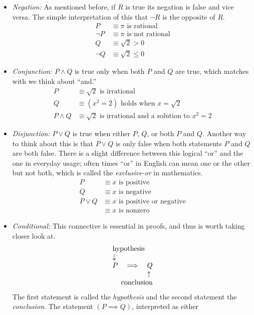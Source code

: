 \documentclass{report}
\begin{document}
\begin{itemize}
	\item \emph{Negation:} As mentioned before, if $R$ is true its negation is false and vice versa. The simple interpretation of this that $\neg R$ is the opposite of $R$.
	\begin{align*}
		P &\equiv \text{$\pi$ is rational} \\
		\neg P &\equiv \text{$\pi$ is not rational} \\
		Q &\equiv \sqrt{2} > 0 \\
		\neg Q &\equiv \sqrt{2} \le 0
	\end{align*}
	
	\item \emph{Conjunction:} $P \wedge Q$ is true only when both $P$ and $Q$ are true, which matches with we think about ``and.''
	\begin{align*}
		P &\equiv \text{$\sqrt{2}$ is irrational} \\
		Q &\equiv \text{$(x^2 = 2)$ holds when $x = \sqrt{2}$} \\
		P \wedge Q &\equiv \text{$\sqrt{2}$ is irrational and a solution to $x^2 = 2$}
	\end{align*}

	\item \emph{Disjunction:} $P \lor Q$ is true when either $P$, $Q$, or both $P$ and $Q$. Another way to think about this is that  $P \lor Q$ is only false when both statements $P$ and $Q$ are both false. There is a slight difference between this logical ``or'' and the one in everyday usage; often times ``or'' in English can mean one or the other but not both, which is called the \emph{exclusive-or} in mathematics.
	\begin{align*}
		P &\equiv \text{$x$ is positive} \\
		Q &\equiv \text{$x$ is negative} \\
		P \lor Q &\equiv \text{$x$ is positive or negative} \\
		&\equiv \text{$x$ is nonzero}
	\end{align*}
	
	\item \emph{Conditional:} This connective is essential in proofs, and thus is worth taking closer look at.
	\begin{align*}
	\begin{array}{lll}
		\multicolumn{3}{l}{\text{hypothesis}} \\
		\downarrow && \\
		P & \implies & Q \\
		&& \uparrow \\
		\multicolumn{3}{r}{\text{conclusion}}
	\end{array}
	\end{align*}
	The first statement is called the \emph{hypothesis} and the second statement the \emph{conclusion}. The statement $(P \implies Q)$, interpreted as either
	

\end{itemize}
\end{document}
